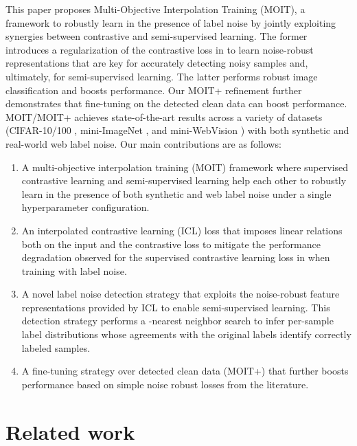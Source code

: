 \documentclass[final]{cvpr}
\begin{document}
This paper proposes Multi-Objective Interpolation Training (MOIT), a framework to robustly learn in the presence of label noise by jointly exploiting synergies between contrastive and semi-supervised learning. The former introduces a regularization of the contrastive loss in \cite{2020_arXiv_SupContLearn} to learn noise-robust representations that are key for accurately detecting noisy samples and, ultimately, for semi-supervised learning. The latter performs robust image classification and boosts performance.
Our MOIT+ refinement further demonstrates that fine-tuning on the detected clean data can boost performance. MOIT/MOIT+ achieves state-of-the-art results across a variety of datasets (CIFAR-10/100 \cite{2009_CIFAR}, mini-ImageNet \cite{2020_ICML_DatasetOOD}, and mini-WebVision \cite{2017_arXiv_WebVision}) with both synthetic and real-world web label noise. Our main contributions are as follows:
\begin{enumerate}
\item A multi-objective interpolation training (MOIT) framework where supervised contrastive learning and semi-supervised learning help each other to robustly learn in the presence of both synthetic and web label noise under a single hyperparameter configuration.
\item An interpolated contrastive learning (ICL) loss that imposes linear relations both on the input and the contrastive loss to mitigate the performance degradation observed for the supervised contrastive learning loss in \cite{2020_arXiv_SupContLearn} when training with label noise.

\item A novel label noise detection strategy that exploits the noise-robust feature representations provided by ICL to enable semi-supervised learning. This detection strategy performs a -nearest neighbor search to infer per-sample label distributions whose agreements with the original labels identify correctly labeled samples.


\item A fine-tuning strategy over detected clean data (MOIT+) that further boosts performance based on simple noise robust losses from the literature.

\end{enumerate}

\section{Related work}
\end{document}
